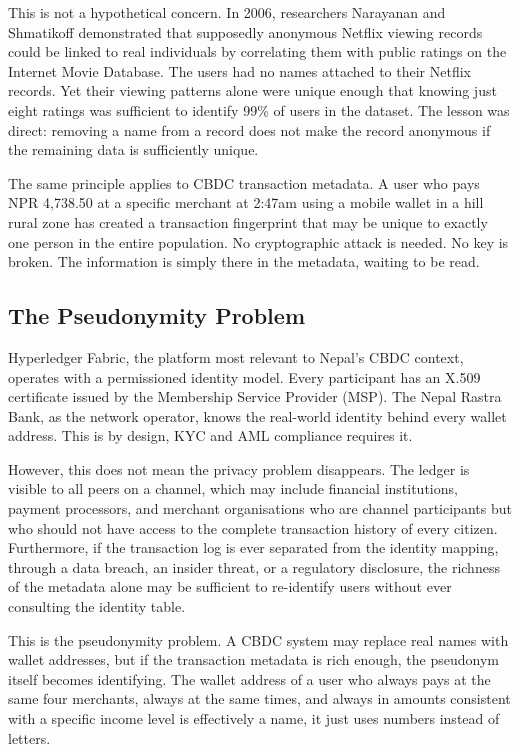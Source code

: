 This is not a hypothetical concern. In 2006, researchers
Narayanan and Shmatikoff demonstrated that supposedly
anonymous Netflix viewing records could be linked to real
individuals by correlating them with public ratings on
the Internet Movie Database. The users had no names
attached to their Netflix records. Yet their viewing
patterns alone were unique enough that knowing just eight
ratings was sufficient to identify 99\% of users in the
dataset. The lesson was direct: removing a name from a
record does not make the record anonymous if the
remaining data is sufficiently unique.

The same principle applies to CBDC transaction metadata.
A user who pays NPR 4,738.50 at a specific merchant at
2:47am using a mobile wallet in a hill rural zone has
created a transaction fingerprint that may be unique to
exactly one person in the entire population. No
cryptographic attack is needed. No key is broken. The
information is simply there in the metadata, waiting to
be read.

\subsection{The Pseudonymity Problem}

Hyperledger Fabric, the platform most relevant to Nepal's
CBDC context, operates with a permissioned identity model.
Every participant has an X.509 certificate issued by the
Membership Service Provider (MSP). The Nepal Rastra Bank,
as the network operator, knows the real-world identity
behind every wallet address. This is by design, KYC
and AML compliance requires it.

However, this does not mean the privacy problem disappears.
The ledger is visible to all peers on a channel, which
may include financial institutions, payment processors,
and merchant organisations who are channel participants
but who should not have access to the complete transaction
history of every citizen. Furthermore, if the transaction
log is ever separated from the identity mapping, through
a data breach, an insider threat, or a regulatory
disclosure, the richness of the metadata alone may be
sufficient to re-identify users without ever consulting
the identity table.

This is the pseudonymity problem. A CBDC system may
replace real names with wallet addresses, but if the
transaction metadata is rich enough, the pseudonym itself
becomes identifying. The wallet address of a user who
always pays at the same four merchants, always at the
same times, and always in amounts consistent with a
specific income level is effectively a name, it just
uses numbers instead of letters.

